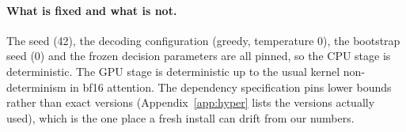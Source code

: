 \documentclass[10pt,twocolumn]{article}
\begin{document}
\paragraph{What is fixed and what is not.} The seed (42), the decoding
configuration (greedy, temperature 0), the bootstrap seed (0) and the frozen
decision parameters are all pinned, so the CPU stage is deterministic. The GPU
stage is deterministic up to the usual kernel non-determinism in bf16 attention.
The dependency specification pins lower bounds rather than exact versions
(Appendix~\ref{app:hyper} lists the versions actually used), which is the one
place a fresh install can drift from our numbers.
\end{document}
